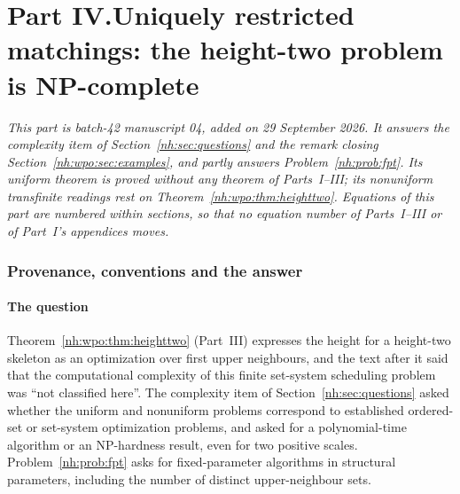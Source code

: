 \documentclass[11pt,a4paper]{article}
\theoremstyle{definition}
\theoremstyle{remark}
\newcounter{nhurSavedEq}
\begin{document}
\clearpage
\setcounter{nhurSavedEq}{\value{equation}}
\let\nhurSavedTheequation\theequation
\let\nhurSavedTheHequation\theHequation
\renewcommand{\theequation}{\thesection.\arabic{equation}}
\def\theHequation{nhur.\thesection.\arabic{equation}}
\part*{Part IV.\quad Uniquely restricted matchings: the height-two problem is NP-complete}

\noindent\emph{This part is batch-42 manuscript 04, added on 29 September
2026. It answers the complexity item of Section~\ref{nh:sec:questions} and
the remark closing Section~\ref{nh:wpo:sec:examples}, and partly answers
Problem~\ref{nh:prob:fpt}. Its uniform theorem is proved without any theorem
of Parts~I--III; its nonuniform transfinite readings rest on
Theorem~\ref{nh:wpo:thm:heighttwo}. Equations of this part are numbered
within sections, so that no equation number of Parts~I--III or of Part~I's
appendices moves.}

\section{Provenance, conventions and the answer}\label{nh:ur:sec:intro}
\setcounter{equation}{0}

\subsection{The question}\label{nh:ur:sec:question}

Theorem~\ref{nh:wpo:thm:heighttwo} (Part~III) expresses the height for a
height-two skeleton as an optimization over first upper neighbours, and the
text after it said that the computational complexity of this finite
set-system scheduling problem was ``not classified here''. The complexity
item of Section~\ref{nh:sec:questions} asked whether the uniform and
nonuniform problems correspond to established ordered-set or set-system
optimization problems, and asked for a polynomial-time algorithm or an
NP-hardness result, even for two positive scales.
Problem~\ref{nh:prob:fpt} asks for fixed-parameter algorithms in structural
parameters, including the number of distinct upper-neighbour sets.
\end{document}
